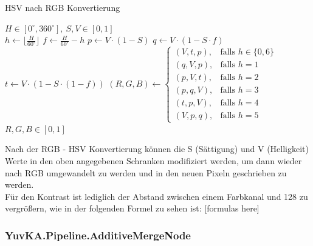 \begin{itemize}
	\begin{algorithm}[H]
	\caption{HSV nach RGB Konvertierung}
		\begin{algorithmic}[1]
			\REQUIRE $ H \in [0^{\circ}, 360^{\circ}],\ S, V \in [0, 1] $ \\
			\STATE $ h \gets \lfloor\frac{H}{60^\circ}\rfloor $
			\STATE $ f \gets \frac{H}{60^{\circ}} - h $
			\STATE $ p \gets V \cdot (1 - S) $ 
			\STATE $ q \gets V \cdot (1 - S \cdot f) $
			\STATE $ t \gets V \cdot (1 - S \cdot (1 - f)) $
			\vspace{5px}
			\STATE $
						(R, G, B) \gets
						\begin{cases}
							(V, t, p), & \text{falls } h \in \{0, 6\} \\
							(q, V, p), & \text{falls } h = 1 \\
							(p, V, t), & \text{falls } h = 2 \\
							(p, q, V), & \text{falls } h = 3 \\
							(t, p, V), & \text{falls } h = 4 \\
							(V, p, q), & \text{falls } h = 5
						\end{cases}
					$
			\vspace{5px}
			\ENSURE $ R, G, B \in [0, 1] $ \\
		\end{algorithmic}
	\end{algorithm} 

	Nach der RGB - HSV Konvertierung können die S (Sättigung) und V (Helligkeit) Werte in den oben angegebenen Schranken modifiziert werden, um dann wieder nach RGB umgewandelt zu werden und in den neuen Pixeln geschrieben zu werden. \\
	Für den Kontrast ist lediglich der Abstand zwischen einem Farbkanal und 128 zu vergrößern, wie in der folgenden Formel zu sehen ist: [formulas here]
%

\end{itemize}

\subsubsection{YuvKA.Pipeline.AdditiveMergeNode}

